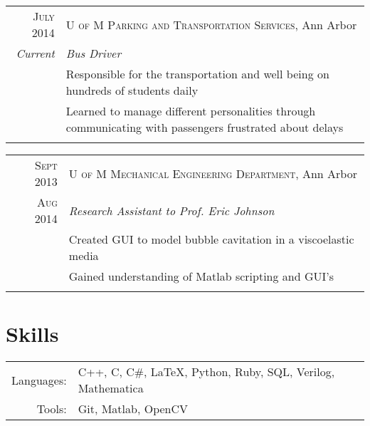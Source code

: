 \documentclass[a4paper,10pt]{article} %
\begin{document}
\begin{tabular}{r|p{13cm}}
\textsc{July 2014} & \textsc{U of M Parking and Transportation Services}, Ann Arbor \\
\emph{Current} & \emph{Bus Driver} \\
& \footnotesize{Responsible for the transportation and well being on hundreds
  of students daily} \\
& \footnotesize{Learned to manage different personalities through communicating
  with passengers frustrated about delays} \\
\multicolumn{2}{c}{} \\
\end{tabular}


\begin{tabular}{r|p{13cm}}
\textsc{Sept 2013} & \textsc{U of M Mechanical Engineering Department}, Ann Arbor \\
\textsc{Aug 2014} & \emph{Research Assistant to Prof. Eric Johnson} \\
& \footnotesize{Created GUI to model bubble cavitation in a viscoelastic media} \\
& \footnotesize{Gained understanding of Matlab scripting and GUI's} \\
\multicolumn{2}{c}{} \\
\end{tabular}



\section{Skills}

\begin{tabular}{rl}
Languages: & C++, C, C\#, \LaTeX, Python, Ruby, SQL, Verilog, Mathematica \\
Tools: & Git, Matlab, OpenCV
\end{tabular}

\clearpage %
\end{document}
